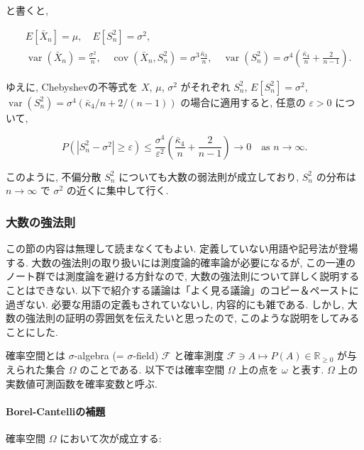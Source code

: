 \documentclass[10pt, a4paper,xelatex,ja=standard]{bxjsarticle}
\newcommand\op{\operatorname}
\newcommand\R{{\mathbb R}}
\newcommand\eps{\varepsilon}
\newcommand\bk{\bar\kappa}
\begin{document}
と書くと,

\[
\begin{aligned}
&
E[\bar{X}_n] = \mu, \quad
E[S_n^2] = \sigma^2,
\\ &
\op{var}(\bar{X}_n) = \frac{\sigma^2}{n}, \quad
\op{cov}(\bar{X}_n, S_n^2) = \sigma^3\frac{\bk_3}{n}, \quad
\op{var}(S_n^2) = \sigma^4\left(\frac{\bk_4}{n} + \frac{2}{n-1}\right).
\end{aligned}
\]

ゆえに, Chebyshevの不等式を \(X\), \(\mu\), \(\sigma^2\) がそれぞれ
\(S_n^2\), \(E[S_n^2] = \sigma^2\),
\(\op{var}(S_n^2) = \sigma^4(\bk_4/n+2/(n-1))\) の場合に適用すると,
任意の \(\eps>0\) について,

\[
P(|S_n^2 - \sigma^2| \ge \eps) \le
\frac{\sigma^4}{\eps^2}\left(\frac{\bk_4}{n} + \frac{2}{n-1}\right) \to 0
\quad\text{as $n\to\infty$}.
\]

このように, 不偏分散 \(S_n^2\) についても大数の弱法則が成立しており,
\(S_n^2\) の分布は \(n\to\infty\) で \(\sigma^2\) の近くに集中して行く.

    \hypertarget{ux5927ux6570ux306eux5f37ux6cd5ux5247}{%
\subsubsection{大数の強法則}\label{ux5927ux6570ux306eux5f37ux6cd5ux5247}}

この節の内容は無理して読まなくてもよい.
定義していない用語や記号法が登場する.
大数の強法則の取り扱いには測度論的確率論が必要になるが,
この一連のノート群では測度論を避ける方針なので,
大数の強法則について詳しく説明することはできない.
以下で紹介する議論は「よく見る議論」のコピー＆ペーストに過ぎない.
必要な用語の定義もされていないし, 内容的にも雑である. しかし,
大数の強法則の証明の雰囲気を伝えたいと思ったので,
このような説明をしてみることにした.

確率空間とは \(\sigma\)-algebra (= \(\sigma\)-field) \(\mathscr{F}\)
と確率測度 \(\mathscr{F}\ni A\mapsto P(A)\in\R_{\ge 0}\)
が与えられた集合 \(\Omega\) のことである. 以下では確率空間 \(\Omega\)
上の点を \(\omega\) と表す. \(\Omega\)
上の実数値可測函数を確率変数と呼ぶ.

    \hypertarget{borel-cantelliux306eux88dcux984c}{%
\paragraph{Borel-Cantelliの補題}\label{borel-cantelliux306eux88dcux984c}}

確率空間 \(\Omega\) において次が成立する:
\end{document}
